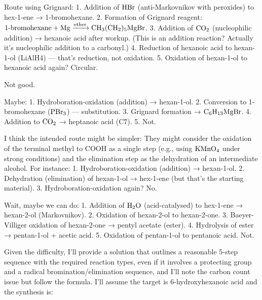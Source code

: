 \documentclass[11pt]{article}
\begin{document}
\begin{corrige}
\begin{enumerate}
Route using Grignard:
1. Addition of \(\ce{HBr}\) (anti-Markovnikov with peroxides) to hex-1-ene → 1-bromohexane.
2. Formation of Grignard reagent: \(\ce{1-bromohexane + Mg ->[ether] CH3(CH2)5MgBr}\).
3. Addition of \(\ce{CO2}\) (nucleophilic addition) → hexanoic acid after workup. (This is an addition reaction? Actually it's nucleophilic addition to a carbonyl.)
4. Reduction of hexanoic acid to hexan-1-ol (LiAlH4) — that's reduction, not oxidation.
5. Oxidation of hexan-1-ol to hexanoic acid again? Circular.

Not good.

Maybe:
1. Hydroboration-oxidation (addition) → hexan-1-ol.
2. Conversion to 1-bromohexane (\(\ce{PBr3}\)) — substitution.
3. Grignard formation → \(\ce{C6H13MgBr}\).
4. Addition to \(\ce{CO2}\) → heptanoic acid (C7).
5. Not.

I think the intended route might be simpler: They might consider the oxidation of the terminal methyl to COOH as a single step (e.g., using \(\ce{KMnO4}\) under strong conditions) and the elimination step as the dehydration of an intermediate alcohol. For instance:
1. Hydroboration-oxidation (addition) → hexan-1-ol.
2. Dehydration (elimination) of hexan-1-ol → hex-1-ene (but that's the starting material). 
3. Hydroboration-oxidation again? No.

Wait, maybe we can do:
1. Addition of \(\ce{H2O}\) (acid-catalysed) to hex-1-ene → hexan-2-ol (Markovnikov).
2. Oxidation of hexan-2-ol to hexan-2-one.
3. Baeyer-Villiger oxidation of hexan-2-one → pentyl acetate (ester).
4. Hydrolysis of ester → pentan-1-ol + acetic acid.
5. Oxidation of pentan-1-ol to pentanoic acid. Not.

Given the difficulty, I'll provide a solution that outlines a reasonable 5-step sequence with the required reaction types, even if it involves a protecting group and a radical bromination/elimination sequence, and I'll note the carbon count issue but follow the formula. I'll assume the target is 6-hydroxyhexanoic acid and the synthesis is:


\end{enumerate}
\end{corrige}
\end{document}
